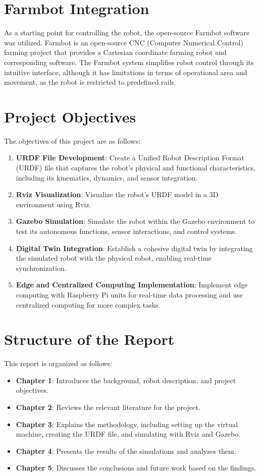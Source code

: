 \section{Farmbot Integration}
As a starting point for controlling the robot, the open-source Farmbot software was utilized. Farmbot is an open-source CNC (Computer Numerical Control) farming project that provides a Cartesian coordinate farming robot and corresponding software. The Farmbot system simplifies robot control through its intuitive interface, although it has limitations in terms of operational area and movement, as the robot is restricted to predefined rails.

\section{Project Objectives}
The objectives of this project are as follows:
\begin{enumerate}
    \item \textbf{URDF File Development}: Create a Unified Robot Description Format (URDF) file that captures the robot's physical and functional characteristics, including its kinematics, dynamics, and sensor integration.
    \item \textbf{Rviz Visualization}: Visualize the robot’s URDF model in a 3D environment using Rviz.
    \item \textbf{Gazebo Simulation}: Simulate the robot within the Gazebo environment to test its autonomous functions, sensor interactions, and control systems.
    \item \textbf{Digital Twin Integration}: Establish a cohesive digital twin by integrating the simulated robot with the physical robot, enabling real-time synchronization.
    \item \textbf{Edge and Centralized Computing Implementation}: Implement edge computing with Raspberry Pi units for real-time data processing and use centralized computing for more complex tasks.
\end{enumerate}

\section{Structure of the Report}
This report is organized as follows:
\begin{itemize}
    \item \textbf{Chapter 1}: Introduces the background, robot description, and project objectives.
    \item \textbf{Chapter 2}: Reviews the relevant literature for the project.
    \item \textbf{Chapter 3}: Explains the methodology, including setting up the virtual machine, creating the URDF file, and simulating with Rviz and Gazebo.
    \item \textbf{Chapter 4}: Presents the results of the simulations and analyzes them.
    \item \textbf{Chapter 5}: Discusses the conclusions and future work based on the findings.
\end{itemize}


